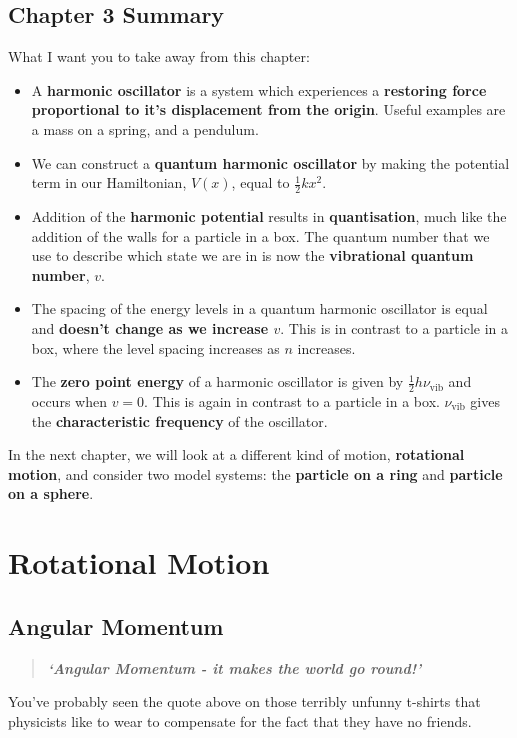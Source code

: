 \documentclass{memoir}[11pt,oneside,a4paper,openany]
\newcommand{\nuv}{\ensuremath{\nu_{\text{vib}}}}
\begin{document}
\section{Chapter 3 Summary}
What I want you to take away from this chapter:
\begin{itemize}
	\item A \textbf{harmonic oscillator} is a system which experiences a \textbf{restoring force proportional to it's displacement from the origin}. Useful examples are a mass on a spring, and a pendulum.
	\item We can construct a \textbf{quantum harmonic oscillator} by making the potential term in our Hamiltonian, $V(x)$, equal to $\frac{1}{2}kx^2$.
	\item Addition of the \textbf{harmonic potential} results in \textbf{quantisation}, much like the addition of the walls for a particle in a box. The quantum number that we use to describe which state we are in is now the \textbf{vibrational quantum number}, $v$.
	\item The spacing of the energy levels in a quantum harmonic oscillator is equal and \textbf{doesn't change as we increase $v$}. This is in contrast to a particle in a box, where the level spacing increases as $n$ increases.
	\item The \textbf{zero point energy} of a harmonic oscillator is given by $\frac{1}{2}h\nuv$ and occurs when $v=0$. This is again in contrast to a particle in a box. $\nuv$ gives the \textbf{characteristic frequency} of the oscillator.
\end{itemize}
In the next chapter, we will look at a different kind of motion, \textbf{rotational motion}, and consider two model systems: the \textbf{particle on a ring} and \textbf{particle on a sphere}.

\chapter{Rotational Motion}

\section{Angular Momentum}
\begin{quote}
	\begin{center}
	\textit{\textbf{`Angular Momentum - it makes the world go round!'}}
	\end{center}
\end{quote}
You've probably seen the quote above on those terribly unfunny t-shirts that physicists like to wear to compensate for the fact that they have no friends.
\end{document}

